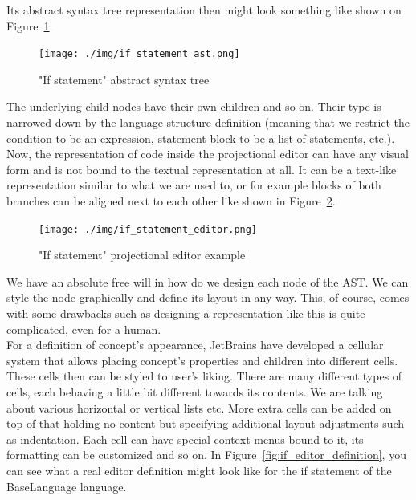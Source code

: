 \vspace{3mm}

Its abstract syntax tree representation then might look something like shown on Figure~\ref{fig:if_ast}.
\\

\begin{figure}[h]
	\centering
	\texttt{[image: ./img/if\_statement\_ast.png]}
	\caption{"If statement" abstract syntax tree}
	\label{fig:if_ast}
\end{figure}

The underlying child nodes have their own children and so on.
Their type is narrowed down by the language structure definition (meaning that we restrict the condition to be an expression, statement block to be a list of statements, etc.).
\\

Now, the representation of code inside the projectional editor can have any visual form and is not bound to the textual representation at all.
It can be a text-like representation similar to what we are used to, or for example blocks of both branches can be aligned next to each other like shown in Figure~\ref{fig:if_editor}.
\\

\begin{figure}[h]
	\centering
	\hspace{-4mm}
	\texttt{[image: ./img/if\_statement\_editor.png]}
	\caption{"If statement" projectional editor example}
	\label{fig:if_editor}
\end{figure}

We have an absolute free will in how do we design each node of the AST.
We can style the node graphically and define its layout in any way.
This, of course, comes with some drawbacks such as designing a representation like this is quite complicated, even for a human.
\\

For a definition of concept's appearance, JetBrains have developed a cellular system that allows placing concept's properties and children into different cells.
These cells then can be styled to user's liking.
There are many different types of cells, each behaving a little bit different towards its contents.
We are talking about various horizontal or vertical lists etc.
More extra cells can be added on top of that holding no content but specifying additional layout adjustments such as indentation.
Each cell can have special context menus bound to it, its formatting can be customized and so on.
In Figure~\ref{fig:if_editor_definition}, you can see what a real editor definition might look like for the if statement of the BaseLanguage language.

